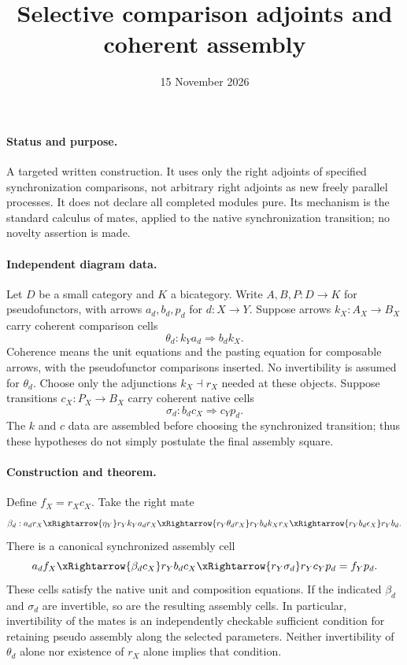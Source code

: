 \documentclass{article}
\title{Selective comparison adjoints and coherent assembly}
\date{15 November 2026}
\begin{document}
\maketitle
\paragraph{Status and purpose.} A targeted written construction. It uses only the right adjoints of specified synchronization comparisons, not arbitrary right adjoints as new freely parallel processes. It does not declare all completed modules pure. Its mechanism is the standard calculus of mates, applied to the native synchronization transition; no novelty assertion is made.

\paragraph{Independent diagram data.} Let $D$ be a small category and $K$ a bicategory. Write $A,B,P:D\to K$ for pseudofunctors, with arrows $a_d,b_d,p_d$ for $d:X\to Y$. Suppose arrows $k_X:A_X\to B_X$ carry coherent comparison cells
\[
 \theta_d:k_Ya_d\Longrightarrow b_dk_X.
\]
Coherence means the unit equations and the pasting equation for composable arrows, with the pseudofunctor comparisons inserted. No invertibility is assumed for $\theta_d$. Choose only the adjunctions $k_X\dashv r_X$ needed at these objects. Suppose transitions $c_X:P_X\to B_X$ carry coherent native cells
\[
 \sigma_d:b_dc_X\Longrightarrow c_Yp_d.
\]
The $k$ and $c$ data are assembled before choosing the synchronized transition; thus these hypotheses do not simply postulate the final assembly square.

\paragraph{Construction and theorem.} Define $f_X=r_Xc_X$. Take the right mate
\[
 \beta_d:a_dr_X
 \xRightarrow{\eta_Y}r_Yk_Ya_dr_X
 \xRightarrow{r_Y\theta_dr_X}r_Yb_dk_Xr_X
 \xRightarrow{r_Yb_d\epsilon_X}r_Yb_d.
\]
There is a canonical synchronized assembly cell
\[
 a_df_X\xRightarrow{\beta_dc_X}r_Yb_dc_X
 \xRightarrow{r_Y\sigma_d}r_Yc_Yp_d=f_Yp_d.
\]
These cells satisfy the native unit and composition equations. If the indicated $\beta_d$ and $\sigma_d$ are invertible, so are the resulting assembly cells. In particular, invertibility of the mates is an independently checkable sufficient condition for retaining pseudo assembly along the selected parameters. Neither invertibility of $\theta_d$ alone nor existence of $r_X$ alone implies that condition.
\end{document}
